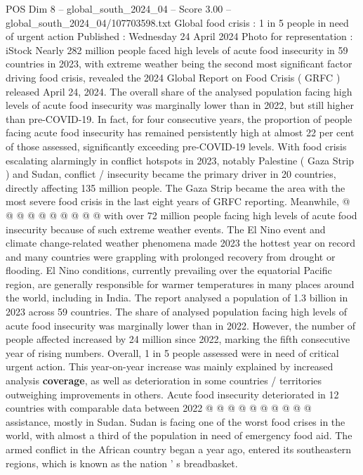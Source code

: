\begin{textsample}{POS Dim 8 – global\_south\_2024\_04 – Score 3.00 – global\_south\_2024\_04/107703598.txt}  \label{ex:f8_pos_415}
Global food crisis : 1 in 5 people in need of urgent action Published : Wednesday 24 April 2024 Photo for representation : iStock Nearly 282 million people faced high levels of acute food insecurity in 59 countries in 2023, with extreme weather being the second most significant factor driving food crisis, revealed the 2024 Global Report on Food Crisis ( GRFC ) released April 24, 2024.
The overall share of the analysed population facing high levels of acute food insecurity was marginally lower than in 2022, but still higher than pre-COVID-19.
In fact, for four consecutive years, the proportion of people facing acute food insecurity has remained persistently high at almost 22 per cent of those assessed, significantly exceeding pre-COVID-19 levels.
With food crisis escalating alarmingly in conflict hotspots in 2023, notably Palestine ( Gaza Strip ) and Sudan, conflict / insecurity became the primary driver in 20 countries, directly affecting 135 million people.
The Gaza Strip became the area with the most severe food crisis in the last eight years of GRFC reporting.
Meanwhile, @ @ @ @ @ @ @ @ @ @ with over 72 million people facing high levels of acute food insecurity because of such extreme weather events.
The El Nino event and climate change-related weather phenomena made 2023 the hottest year on record and many countries were grappling with prolonged recovery from drought or flooding.
El Nino conditions, currently prevailing over the equatorial Pacific region, are generally responsible for warmer temperatures in many places around the world, including in India.
The report analysed a population of 1.3 billion in 2023 across 59 countries.
The share of analysed population facing high levels of acute food insecurity was marginally lower than in 2022.
However, the number of people affected increased by 24 million since 2022, marking the fifth consecutive year of rising numbers.
Overall, 1 in 5 people assessed were in need of critical urgent action.
This year-on-year increase was mainly explained by increased analysis \textbf{coverage}, as well as deterioration in some countries / territories outweighing improvements in others.
Acute food insecurity deteriorated in 12 countries with comparable data between 2022 @ @ @ @ @ @ @ @ @ @ assistance, mostly in Sudan.
Sudan is facing one of the worst food crises in the world, with almost a third of the population in need of emergency food aid.
The armed conflict in the African country began a year ago, entered its southeastern regions, which is known as the nation ' s breadbasket.

\end{textsample}
